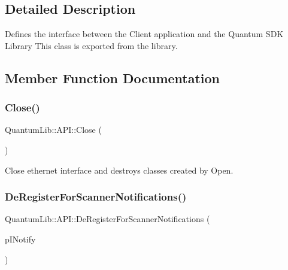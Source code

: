 \subsection{Detailed Description}
Defines the interface between the Client application and the Quantum S\+DK Library This class is exported from the library. 

\subsection{Member Function Documentation}
\mbox{\label{class_quantum_lib_1_1_a_p_i_a6bbad3a3b12aa11c0347edf6cd467622}} 
\subsubsection{\texorpdfstring{Close()}{Close()}}
{\footnotesize\ttfamily Quantum\+Lib\+::\+A\+P\+I\+::\+Close (\begin{DoxyParamCaption}{ }\end{DoxyParamCaption})\hspace{0.3cm}{\ttfamily [static]}}

Close ethernet interface and destroys classes created by Open. \mbox{\label{class_quantum_lib_1_1_a_p_i_ac0ea416a147cf8187e7595cedaf2fdf0}} 
\subsubsection{\texorpdfstring{De\+Register\+For\+Scanner\+Notifications()}{DeRegisterForScannerNotifications()}}
{\footnotesize\ttfamily Quantum\+Lib\+::\+A\+P\+I\+::\+De\+Register\+For\+Scanner\+Notifications (\begin{DoxyParamCaption}\item[{\mbox{\hyperlink{class_quantum_lib_1_1_i_notify}{I\+Notify}} $\ast$}]{p\+I\+Notify }\end{DoxyParamCaption})\hspace{0.3cm}{\ttfamily [static]}}

